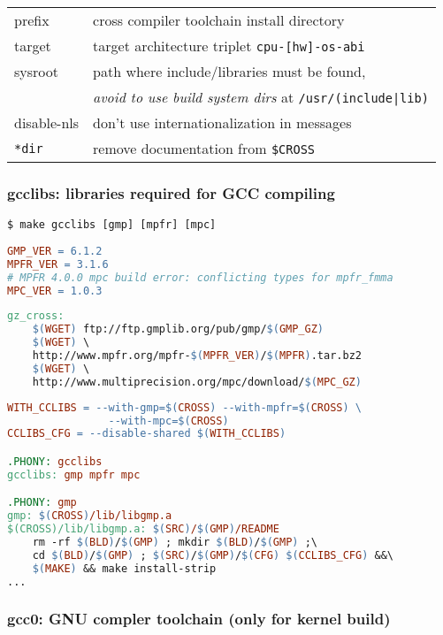 \begin{tabular}{l l}
prefix & cross compiler toolchain install directory\\
target & target architecture triplet \verb|cpu-[hw]-os-abi| \\
sysroot & path where include/libraries must be found,\\
& \emph{avoid to use build system dirs} at \verb$/usr/(include|lib)$\\
\hline
disable-nls & don't use internationalization in messages \\
\verb$*dir$ & remove documentation from \verb|$CROSS|\\
\end{tabular}

\subsubsection{gcclibs: libraries required for GCC compiling}

\begin{lstlisting}
$ make gcclibs [gmp] [mpfr] [mpc]
\end{lstlisting}
\begin{lstlisting}[language=make,title=mk/version]
GMP_VER = 6.1.2
MPFR_VER = 3.1.6
# MPFR 4.0.0 mpc build error: conflicting types for mpfr_fmma  
MPC_VER = 1.0.3
\end{lstlisting}
\begin{lstlisting}[language=make,title=mk/gz]
gz_cross:
	$(WGET) ftp://ftp.gmplib.org/pub/gmp/$(GMP_GZ)
	$(WGET) \
	http://www.mpfr.org/mpfr-$(MPFR_VER)/$(MPFR).tar.bz2
	$(WGET) \
	http://www.multiprecision.org/mpc/download/$(MPC_GZ)
\end{lstlisting}
\begin{lstlisting}[language=make,title=mk/cross]
WITH_CCLIBS = --with-gmp=$(CROSS) --with-mpfr=$(CROSS) \
				--with-mpc=$(CROSS)  
CCLIBS_CFG = --disable-shared $(WITH_CCLIBS)

.PHONY: gcclibs
gcclibs: gmp mpfr mpc

.PHONY: gmp
gmp: $(CROSS)/lib/libgmp.a
$(CROSS)/lib/libgmp.a: $(SRC)/$(GMP)/README
	rm -rf $(BLD)/$(GMP) ; mkdir $(BLD)/$(GMP) ;\
	cd $(BLD)/$(GMP) ; $(SRC)/$(GMP)/$(CFG) $(CCLIBS_CFG) &&\
	$(MAKE) && make install-strip
...	
\end{lstlisting}

\clearpage
\subsubsection{gcc0: GNU compler toolchain (only for kernel build)}


